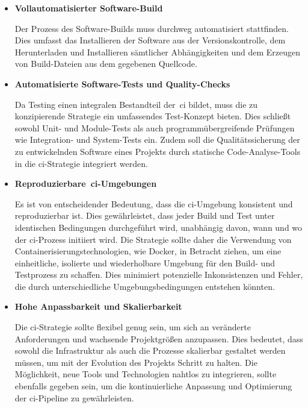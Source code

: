 \begin{itemize}
    \item {
        \textbf{Vollautomatisierter Software-Build}\par
        Der Prozess des Software-Builds muss durchweg automatisiert stattfinden.
        Dies umfasst das Installieren der Software aus der Versionskontrolle, dem Herunterladen und Installieren
        sämtlicher Abhängigkeiten und dem Erzeugen von Build-Dateien aus dem gegebenen Quellcode.
    }

    \item {
        \textbf{Automatisierte Software-Tests und Quality-Checks}\par
        Da Testing einen integralen Bestandteil der\ \acrshort{ci} bildet, muss die zu konzipierende Strategie ein
        umfassendes Test-Konzept bieten.
        Dies schließt sowohl Unit- und Module-Tests als auch programmübergreifende Prüfungen wie Integration- und
        System-Tests ein.
        Zudem soll die Qualitätssicherung der zu entwickelnden Software eines Projekts durch statische
        Code-Analyse-Tools in die \acrshort{ci}-Strategie integriert werden.
    }

    \item {
        \textbf{Reproduzierbare\ \acrshort{ci}-Umgebungen}\par
        Es ist von entscheidender Bedeutung, dass die \acrshort{ci}-Umgebung konsistent und reproduzierbar ist.
        Dies gewährleistet, dass jeder Build und Test unter identischen Bedingungen durchgeführt wird, unabhängig davon,
        wann und wo der \acrshort{ci}-Prozess initiiert wird.
        Die Strategie sollte daher die Verwendung von Containerisierungstechnologien, wie Docker, in Betracht ziehen,
        um eine einheitliche, isolierte und wiederholbare Umgebung für den Build- und Testprozess zu schaffen.
        Dies minimiert potenzielle Inkonsistenzen und Fehler, die durch unterschiedliche Umgebungsbedingungen entstehen
        könnten.
    }

    \item {
        \textbf{Hohe Anpassbarkeit und Skalierbarkeit}\par
        Die \acrshort{ci}-Strategie sollte flexibel genug sein, um sich an veränderte Anforderungen und wachsende
        Projektgrößen anzupassen.
        Dies bedeutet, dass sowohl die Infrastruktur als auch die Prozesse skalierbar gestaltet werden müssen, um mit
        der Evolution des Projekts Schritt zu halten.
        Die Möglichkeit, neue Tools und Technologien nahtlos zu integrieren, sollte ebenfalls gegeben sein, um die
        kontinuierliche Anpassung und Optimierung der \acrshort{ci}-Pipeline zu gewährleisten.
    }


\end{itemize}
